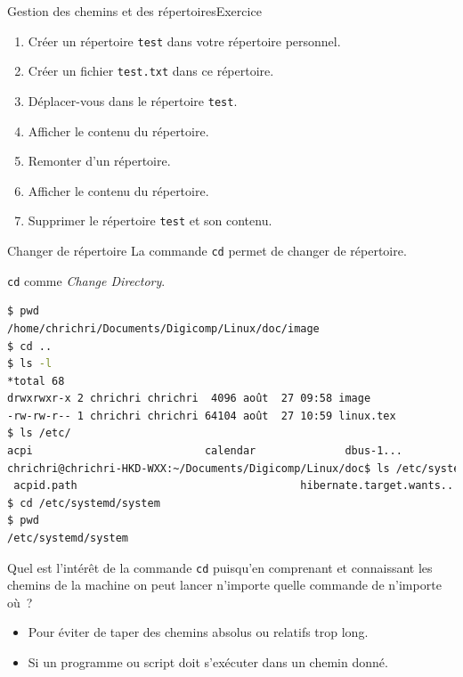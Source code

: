 \documentclass{beamer}
\begin{document}
    \begin{frame}{Gestion des chemins et des répertoires}{Exercice \execcounterdispinc}
        \begin{enumerate}
            \item Créer un répertoire \lstinline{test} dans votre répertoire personnel.
            \item Créer un fichier \lstinline{test.txt} dans ce répertoire.
            \item Déplacer-vous dans le répertoire \lstinline{test}.
            \item Afficher le contenu du répertoire.
            \item Remonter d'un répertoire.
            \item Afficher le contenu du répertoire.
            \item Supprimer le répertoire \lstinline{test} et son contenu.
        \end{enumerate}
    \end{frame}


    \begin{frame}[fragile]{Changer de répertoire}
        La commande \lstinline{cd} permet de changer de répertoire.

        \lstinline{cd} comme \textit{Change Directory}.
        \begin{lstlisting}[language=bash,basicstyle=\tiny\ttfamily]
$ pwd
/home/chrichri/Documents/Digicomp/Linux/doc/image
$ cd ..
$ ls -l
*total 68
drwxrwxr-x 2 chrichri chrichri  4096 août  27 09:58 image
-rw-rw-r-- 1 chrichri chrichri 64104 août  27 10:59 linux.tex
$ ls /etc/
acpi                           calendar              dbus-1...
chrichri@chrichri-HKD-WXX:~/Documents/Digicomp/Linux/doc$ ls /etc/systemd/system
 acpid.path                                   hibernate.target.wants...
$ cd /etc/systemd/system
$ pwd
/etc/systemd/system
        \end{lstlisting}
        Quel est l'intérêt de la commande \lstinline{cd} puisqu'en comprenant et connaissant les chemins de la machine on peut lancer n'importe quelle commande de n'importe où~?
        \pause
        \begin{itemize}
            \item Pour éviter de taper des chemins absolus ou relatifs trop long.
            \item Si un programme ou script doit s'exécuter dans un chemin donné.
        \end{itemize}
    \end{frame}
\end{document}
